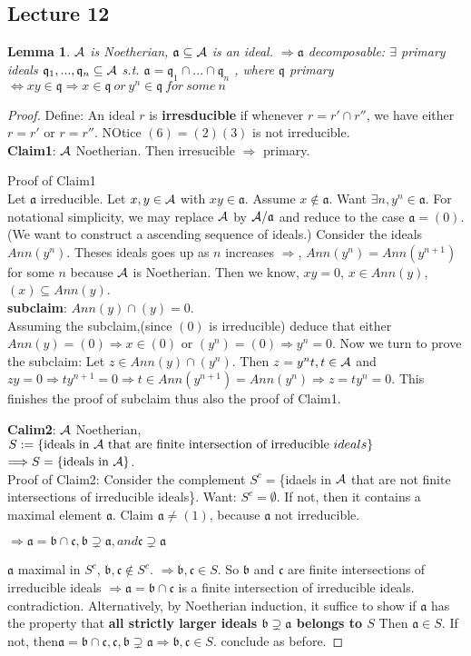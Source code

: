 \documentclass[11pt]{article}
\newtheorem{lemma}[thm]{Lemma}
\newcommand{\sca}{{\mathfrak a}}
\newcommand{\scb}{{\mathfrak b}}
\newcommand{\scc}{{\mathfrak c}}
\newcommand{\scq}{\mathfrak q}
\newcommand{\cala}{{\cal A}}
\newcommand{\Lrta}{\Longrightarrow}
\newcommand{\Llrta}{\Longleftrightarrow}
\begin{document}
\subsection{Lecture 12}
\begin{lemma}
$\cala$ is Noetherian, $\sca\subseteq \cala$ is an ideal. $\Lrta\sca$ decomposable:
$\exists $ primary ideals $\scq_1,...,\scq_n\subseteq \cala$ s.t. $\sca=\scq_1\cap...\cap\scq_n$
, where $\scq$ primary $\Llrta x y\in \scq\Lrta x\in \scq\ or\ y^n\in \scq\ for\ some \ n$\end{lemma}
\begin{proof}
Define: An ideal $r$ is \textbf{irresducible} if whenever $r=r'\cap r''$, we have either $r=r'$ or $r=r''$. NOtice $(6)=(2)(3)$ is not irreducible.\\
\textbf{Claim1}: $\cala$ Noetherian. Then irresucible $\Lrta$ primary.

Proof of Claim1\\
Let $\sca$ irreducible. Let $x,y\in \cala$ with $xy \in \sca$. Assume $x\notin \sca$. Want $\exists n,y^n\in\sca$. For notational simplicity, we may replace $\cala$ by $\cala/\sca$ and reduce to the case $\sca=(0)$. (We want to construct a ascending sequence of ideals.) Consider the ideals $Ann(y^n)$. Theses ideals goes up  as $n$ increases $\Lrta$, $Ann(y^n)=Ann(y^{n+1})$ for some $n$ because $\cala$ is Noetherian. Then we know, $xy=0$, $x\in Ann(y)$, $(x)\subseteq Ann(y)$.\\
\textbf{subclaim}: $Ann(y)\cap(y)=0$.\\
 Assuming the subclaim,(since $(0)$ is irreducible) deduce that either $Ann(y)=(0)\Lrta x\in (0)$ or $(y^n)=(0)\Lrta y^n=0$.
 Now we turn to prove the subclaim: Let $z\in Ann(y)\cap(y^n)$. Then $z=y^n t, t\in \cala $ and $zy=0\Lrta t y^{n+1}=0\Lrta t\in Ann(y^{n+1})=Ann(y^n)\Lrta z= t y^n=0$. This finishes the proof of subclaim thus also the proof of Claim1.

 \textbf{Calim2}: $\cala$ Noetherian, $S:=\{\text{ideals in $\cala$ that are finite intersection of irreducible }ideals\}$ $\Lrta S=\{\text{ideals in $\cala$}\}$. \\
 Proof of Claim2: Consider the complement $S^c=$\{idaels in $\cala$ that are not finite intersections of irreducible ideals\}. Want: $S^c=\emptyset$. If not, then it contains a maximal element $\sca$. Claim $\sca\neq (1)$, because $\sca$ not irreducible. 

 $\Lrta\sca=\scb\cap \scc,\scb\supsetneq\sca, and \scc\supsetneq \sca$

 $\sca$ maximal in $S^c$, $\scb, \scc\notin S^c$. $\Lrta \scb,\scc\in S$. So $\scb$ and $\scc$ are finite intersections of irreducible ideals $\Lrta\sca=\scb\cap\scc$ is a finite intersection of irreducible ideals. contradiction.
Alternatively, by Noetherian induction, it suffice to show if $\sca$ has the property that \textbf{all strictly larger ideals $\scb\supsetneq \sca$ belongs to $S$} Then $\sca\in S$. If not, then$\sca=\scb\cap\scc, \scc,\scb\supsetneq \sca\Lrta \scb,\scc\in S$. conclude as before.
\end{proof}
\end{document}
